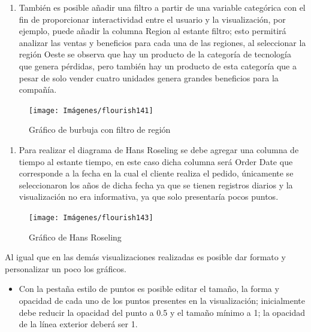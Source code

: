 \documentclass[
]{book}
\providecommand{\tightlist}{%
  \setlength{\itemsep}{0pt}\setlength{\parskip}{0pt}}
\begin{document}
\begin{enumerate}
\def\labelenumi{\arabic{enumi}.}
\setcounter{enumi}{3}
\tightlist
\item
  También es posible añadir una filtro a partir de una variable categórica con el fin de proporcionar interactividad entre el usuario y la visualización, por ejemplo, puede añadir la columna Region al estante filtro; esto permitirá analizar las ventas y beneficios para cada una de las regiones, al seleccionar la región Oeste se observa que hay un producto de la categoría de tecnología que genera pérdidas, pero también hay un producto de esta categoría que a pesar de solo vender cuatro unidades genera grandes beneficios para la compañía.
\end{enumerate}

\begin{figure}

{\centering \texttt{[image: Imágenes/flourish141]} 

}

\caption{Gráfico de burbuja con filtro de región}\label{fig:graficoburbujaconfiltroflourish-fig}
\end{figure}

\begin{enumerate}
\def\labelenumi{\arabic{enumi}.}
\setcounter{enumi}{4}
\tightlist
\item
  Para realizar el diagrama de Hans Roseling se debe agregar una columna de tiempo al estante tiempo, en este caso dicha columna será Order Date que corresponde a la fecha en la cual el cliente realiza el pedido, únicamente se seleccionaron los años de dicha fecha ya que se tienen registros diarios y la visualización no era informativa, ya que solo presentaría pocos puntos.
\end{enumerate}

\begin{figure}

{\centering \texttt{[image: Imágenes/flourish143]} 

}

\caption{Gráfico de Hans Roseling}\label{fig:hansroselingflourish-fig}
\end{figure}

Al igual que en las demás visualizaciones realizadas es posible dar formato y personalizar un poco los gráficos.

\begin{itemize}
\tightlist
\item
  Con la pestaña estilo de puntos es posible editar el tamaño, la forma y opacidad de cada uno de los puntos presentes en la visualización; inicialmente debe reducir la opacidad del punto a 0.5 y el tamaño mínimo a 1; la opacidad de la línea exterior deberá ser 1.
\end{itemize}
\end{document}
